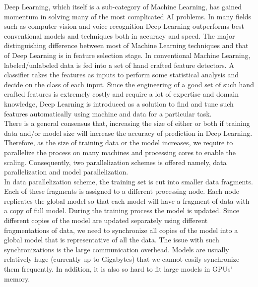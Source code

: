 \documentclass[runningheads,a4paper]{llncs}
\begin{document}
{\begin{table}
\begin{tabular}{ |p{3cm}|p{9cm}|  }
	\end{tabular}
	\label{table:Domo}
\end{table}

Deep Learning, which itself is a sub-category of Machine Learning, has gained momentum in solving many of the most complicated AI problems. In many fields such as computer vision and voice recognition Deep Learning outperforms best conventional models and techniques both in accuracy and speed. The major distinguishing difference between most of Machine Learning techniques and that of Deep Learning is in feature selection stage. In conventional Machine Learning, labeled/unlabeled data is fed into a set of hand crafted feature detectors. A classifier takes the features as inputs to perform some statistical analysis and decide on the class of each input. Since the engineering of a good set of such hand crafted features is extremely costly and require a lot of expertise and domain knowledge, Deep Learning is introduced as a solution to find and tune such features automatically using machine and data for a particular task.\\

There is a general consensus that, increasing the size of either or both if training data and/or model size will increase the accuracy of prediction in Deep Learning. Therefore, as the size of training data or the model increases, we require to parallelize the process on many machines and processing cores to enable the scaling. Consequently, two parallelization schemes is offered namely, data parallelization and model parallelization.\\

In data parallelization scheme, the training set is cut into smaller data fragments. Each of these fragments is assigned to a different processing node. Each node replicates the global model so that each model will have a fragment of data with a copy of full model. During the training process the model is updated. Since different copies of the model are updated separately using different fragmentations of data, we need to synchronize all copies of the model into a global model that is representative of all the data. The issue with such synchronizations is the large communication overhead. Models are usually relatively huge (currently up to Gigabytes) that we cannot easily synchronize them frequently. In addition, it is also so hard to fit large models in GPUs' memory.\\

}
\end{document}
